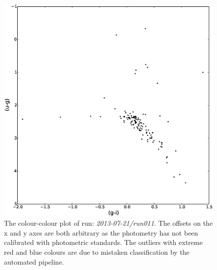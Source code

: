 \begin{figure}
\centering
\includegraphics[width=120mm]{images/2013-07-21-run011-2colour.eps}
\caption{The colour-colour plot of run: \emph{2013-07-21/run011}. The offsets on the x and y axes are both arbitrary as the photometry has not been calibrated with photometric standards. The outliers with extreme red and blue colours are due to mistaken classification by the automated pipeline. }
\label{fig:run011-2colour}
\end{figure}


